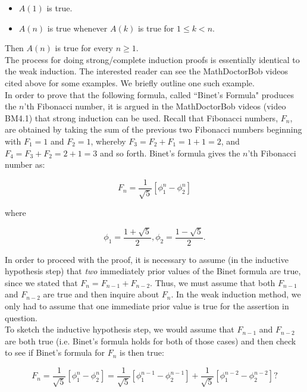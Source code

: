 \begin{itemize}
\item $A(1)$ is true.
\item $A(n)$ is true whenever $A(k)$ is true for $1 \le k < n$.
\end{itemize}

Then $A(n)$ is true for every $n \ge 1$.\\

The process for doing strong/complete induction proofs is essentially identical to the weak induction.  The interested reader can see the MathDoctorBob videos cited above for some examples.  We briefly outline one such example.\\

In order to prove that the following formula, called ``Binet's Formula" produces the $n$'th Fibonacci number, it is argued in the MathDoctorBob videos (video BM4.1) that strong induction can be used.  Recall that Fibonacci numbers, $F_{n}$, are obtained by taking the sum of the previous two Fibonacci numbers beginning with $F_{1}=1$ and $F_{2}=1$, whereby $F_{3}=F_{2}+F_{1}=1+1=2$, and $F_{4}=F_{3}+F_{2}=2+1=3$ and so forth.  Binet's formula gives the $n$'th Fibonacci number as:

\begin{displaymath}
F_{n}=\frac{1}{\sqrt{5}}\left[\phi_{1}^{n}-\phi_{2}^{n}\right]
\end{displaymath} 

where

\begin{displaymath}
\phi_{1}=\frac{1+\sqrt{5}}{2}, \phi_{2}=\frac{1-\sqrt{5}}{2}.
\end{displaymath}

In order to proceed with the proof, it is necessary to assume (in the inductive hypothesis step) that \textit{two} immediately prior values of the Binet formula are true, since we stated that $F_{n}=F_{n-1}+F_{n-2}$.  Thus, we must assume that both $F_{n-1}$ and $F_{n-2}$ are true and then inquire about $F_{n}$.  In the weak induction method, we only had to assume that one immediate prior value is true for the assertion in question.\\

To sketch the inductive hypothesis step, we would assume that $F_{n-1}$ and $F_{n-2}$ are both true (i.e. Binet's formula holds for both of those cases) and then check to see if Binet's formula for $F_{n}$ is then true:

\begin{displaymath}
F_{n}=\frac{1}{\sqrt{5}}\left[\phi_{1}^{n}-\phi_{2}^{n}\right]=\frac{1}{\sqrt{5}}\left[\phi_{1}^{n-1}-\phi_{2}^{n-1}\right]+\frac{1}{\sqrt{5}}\left[\phi_{1}^{n-2}-\phi_{2}^{n-2}\right]?
\end{displaymath}

